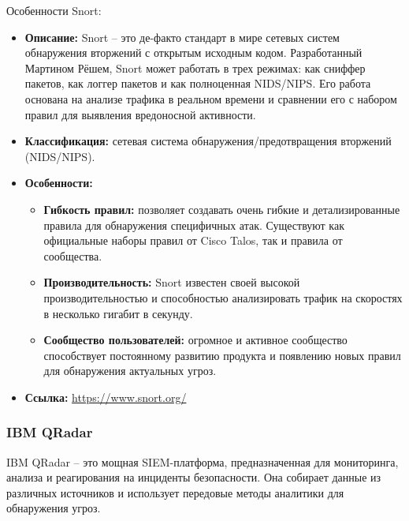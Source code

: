 Особенности Snort:
\begin{itemize}
		\item \textbf{Описание:} Snort -- это де-факто стандарт в мире сетевых систем обнаружения вторжений с открытым исходным кодом. Разработанный Мартином Рёшем, Snort может работать в трех режимах: как сниффер пакетов, как логгер пакетов и как полноценная NIDS/NIPS. Его работа основана на анализе трафика в реальном времени и сравнении его с набором правил для выявления вредоносной активности.
    \item \textbf{Классификация:} сетевая система обнаружения/предотвращения вторжений (NIDS/NIPS).
    \item \textbf{Особенности:}
    \begin{itemize}
        \item \textbf{Гибкость правил:} позволяет создавать очень гибкие и детализированные правила для обнаружения специфичных атак. Существуют как официальные наборы правил от Cisco Talos, так и правила от сообщества.
        \item \textbf{Производительность:} Snort известен своей высокой производительностью и способностью анализировать трафик на скоростях в несколько гигабит в секунду.
        \item \textbf{Сообщество пользователей:} огромное и активное сообщество способствует постоянному развитию продукта и появлению новых правил для обнаружения актуальных угроз.
    \end{itemize}
    \item \textbf{Ссылка:} \url{https://www.snort.org/}
\end{itemize}

\subsubsection{IBM QRadar}

IBM QRadar -- это мощная SIEM-платформа, предназначенная для мониторинга, анализа и реагирования на инциденты безопасности. Она собирает данные из различных источников и использует передовые методы аналитики для обнаружения угроз.

